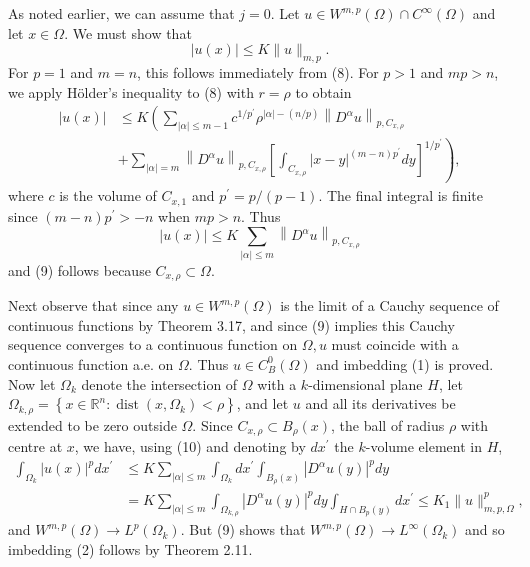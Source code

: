 \begin{para}
  As noted earlier, we can assume that $j=0$. Let $u \in W^{m, p}(\Omega) \cap C^{\infty}(\Omega)$ 
  and let $x \in \Omega$. We must show that
  \[
  |u(x)| \leq K\|u\|_{m, p} .
  \]
  For $p=1$ and $m=n$, this follows immediately from (8). For $p>1$ and $m p>n$, we apply Hölder's inequality to (8) with $r=\rho$ to obtain
  \[
  \begin{aligned}
  |u(x)| & \leq K\left(\sum_{|\alpha| \leq m-1} c^{1 / p^{\prime}} \rho^{|\alpha|-(n / p)}\left\|D^\alpha u\right\|_{p, C_{x, \rho}}\right. \\
  & \left.+\sum_{|\alpha|=m}\left\|D^\alpha u\right\|_{p, C_{x, \rho}}\left[\int_{C_{x, \rho}}|x-y|^{(m-n) p^{\prime}} d y\right]^{1 / p^{\prime}}\right),
  \end{aligned}
  \]
  where $c$ is the volume of $C_{x, 1}$ and $p^{\prime}=p /(p-1)$. The final integral is finite since $(m-n) p^{\prime}>-n$ when $m p>n$. Thus
  \[
  |u(x)| \leq K \sum_{|\alpha| \leq m}\left\|D^\alpha u\right\|_{p, C_{x, \rho}}
  \]
  and (9) follows because $C_{x, \rho} \subset \Omega$.
  
  Next observe that since any $u \in W^{m, p}(\Omega)$ is the limit of a Cauchy sequence of continuous functions by Theorem 3.17, and since (9) implies this Cauchy sequence converges to a continuous function on $\Omega, u$ must coincide with a continuous function a.e. on $\Omega$. Thus $u \in C_B^0(\Omega)$ and imbedding (1) is proved.
  Now let $\Omega_k$ denote the intersection of $\Omega$ with a $k$-dimensional plane $H$, let $\Omega_{k, \rho}=\left\{x \in \mathbb{R}^n: \operatorname{dist}\left(x, \Omega_k\right)<\rho\right\}$, and let $u$ and all its derivatives be extended to be zero outside $\Omega$. Since $C_{x, \rho} \subset B_\rho(x)$, the ball of radius $\rho$ with centre at $x$, we have, using (10) and denoting by $d x^{\prime}$ the $k$-volume element in $H$,
  \[
  \begin{aligned}
  \int_{\Omega_k}|u(x)|^p d x^{\prime} & \leq K \sum_{|\alpha| \leq m} \int_{\Omega_k} d x^{\prime} \int_{B_\rho(x)}\left|D^\alpha u(y)\right|^p d y \\
  & =K \sum_{|\alpha| \leq m} \int_{\Omega_{k, \rho}}\left|D^\alpha u(y)\right|^p d y \int_{H \cap B_p(y)} d x^{\prime} \leq K_1\|u\|_{m, p, \Omega}^p,
  \end{aligned}
  \]
  and $W^{m, p}(\Omega) \rightarrow L^p\left(\Omega_k\right)$. But (9) shows that $W^{m, p}(\Omega) \rightarrow L^{\infty}\left(\Omega_k\right)$ and so imbedding (2) follows by Theorem 2.11.
\end{para}

